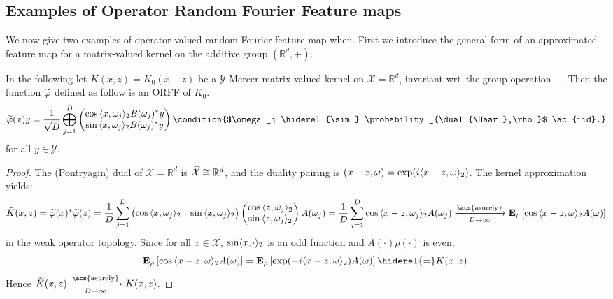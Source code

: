 \subsection{Examples of Operator Random Fourier Feature maps}
\label{subsec:examples_ORFF} We now give two examples of operator-valued random
Fourier feature map when. First we introduce the general form of an
approximated feature map for a matrix-valued kernel on the additive group
$(\mathbb{R}^d,+)$.
\begin{example}
    \label{ex:additive_group} In the following let $K(x,z)=K_0(x-z)$ be a
    $\mathcal{Y}$-Mercer matrix-valued kernel on $\mathcal{X}=\mathbb{R}^d$,
    invariant \acs{wrt}~the group operation $+$. Then the function
    $\tildePhi{\omega}$ defined as follow is an \acl{ORFF} of $K_{0}$.
    \begin{dmath*}
        \tildePhi{\omega}(x)y=\frac{1}{\sqrt{D}}\Vect_{j=1}^D
        \begin{pmatrix}
            \cos{\inner{x,\omega_j}_2}B(\omega_j)^\adjoint y \\ 
            \sin{\inner{x,\omega_j}_2}B(\omega_j)^\adjoint y
        \end{pmatrix}
        \condition{$\omega_j \hiderel{\sim} \probability_{\dual{\Haar},\rho}$
        \ac{iid}.}
    \end{dmath*}
    for all $y\in\mathcal{Y}$.
\end{example}
\begin{proof}
    The (Pontryagin) dual of $\mathcal{X}=\mathbb{R}^d$ is
    $\widehat{\mathcal{X}}\cong\mathbb{R}^d$, and the duality pairing is
    $(x-z,\omega)=\exp(i\langle x-z, \omega\rangle_2)$. The kernel
    approximation yields:
    \begin{dmath*}
        \tilde{K}(x,z)=\tildePhi{\omega}(x)^\adjoint \tildePhi{\omega}(z)
        = \frac{1}{D} \sum_{j=1}^D \begin{pmatrix} \cos{\inner{x,\omega_j}_2} &
        \sin{\inner{x,\omega_j}_2}
        \end{pmatrix}\begin{pmatrix}\cos{\inner{z,\omega_j}_2} \\
        \sin{\inner{z,\omega_j}_2} \end{pmatrix} A(\omega_j)
        = \frac{1}{D} \sum_{j=1}^D \cos{\inner{x-z,\omega_j}_2}A(\omega_j) \\
        \converges{\acs{asurely}}{D \to \infty} \expectation_\rho
        \left[\cos{\inner{x - z,\omega}_2} A(\omega)\right]
    \end{dmath*}
    in the weak operator topology. Since for all $x\in\mathcal{X}$,
    $\sin\langle x, \cdot\rangle_2$ is an odd function and $A(\cdot)\rho(\cdot)$ is
    even,
    \begin{dmath*}
        \expectation_\rho\left[\cos{\inner{x-z,\omega}_2}A(\omega)\right]
        = \expectation_\rho \left[\exp(-i\inner{x-z,\omega}_2)A(\omega)\right]
        \hiderel{=}K(x,z).
    \end{dmath*}
    Hence $\tilde{K}(x,z)\converges{\acs{asurely}}{D\to\infty}K(x,z)$.
\end{proof}
